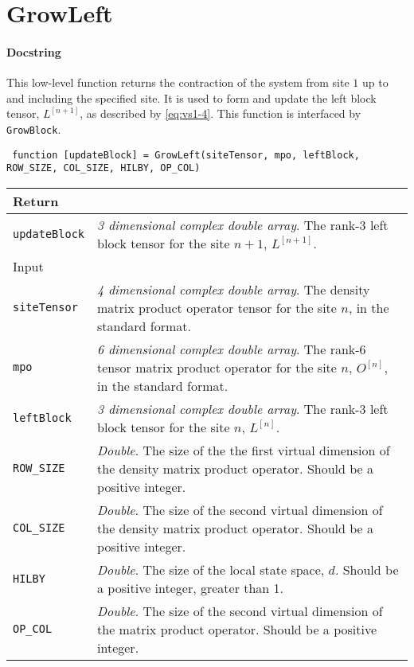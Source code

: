 \section{GrowLeft}
 \paragraph{Docstring} This low-level function returns the contraction of the system from site \(1\) up to and including the specified site. It is used to form and update the left block tensor, \(L^{[n+1]}\), as described by \cref{eq:vs1-4}. This function is interfaced by \lstinline$GrowBlock$.
 \begin{lstlisting}
 function [updateBlock] = GrowLeft(siteTensor, mpo, leftBlock, ROW_SIZE, COL_SIZE, HILBY, OP_COL) \end{lstlisting}
 \begin{longtabu}{X[1,l]X[4,l]}
 \hline
 Return & \\ \hline
 \lstinline$updateBlock$ & \emph{3 dimensional complex double array}. The rank-3 left block tensor for the site \(n + 1\), \(L^{[n+1]}\). \\ \hline
 Input & \\ \hline
 \lstinline$siteTensor$ & \emph{4 dimensional complex double array}. The density matrix product operator tensor for the site \(n\), in the standard format. \\
 \lstinline$mpo$ & \emph{6 dimensional complex double array}. The rank-6 tensor matrix product operator for the site \(n\), \(O^{[n]}\), in the standard format. \\
 \lstinline$leftBlock$ & \emph{3 dimensional complex double array}. The rank-3 left block tensor for the site \(n\), \(L^{[n]}\). \\
 \lstinline$ROW_SIZE$ & \emph{Double}. The size of the the first virtual dimension of the density matrix product operator. Should be a positive integer. \\
 \lstinline$COL_SIZE$ & \emph{Double}. The size of the second virtual dimension of the density matrix product operator. Should be a positive integer. \\
 \lstinline$HILBY$ & \emph{Double}. The size of the local state space, \(d\). Should be a positive integer, greater than 1. \\
 \lstinline$OP_COL$ & \emph{Double}. The size of the second virtual dimension of the matrix product operator. Should be a positive integer. \\
 \hline
 \end{longtabu}
